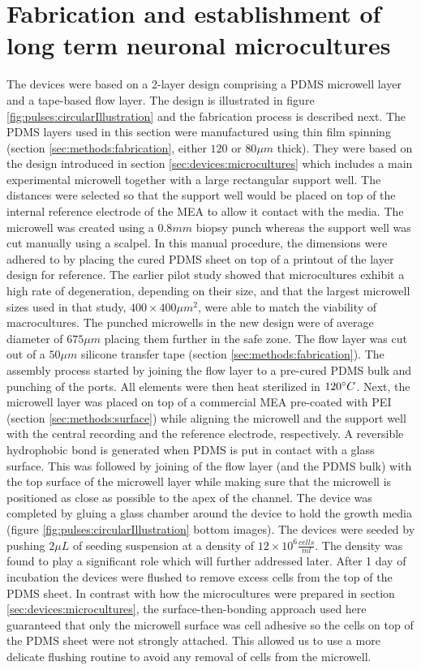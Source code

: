 \section{Fabrication and establishment of long term neuronal microcultures}
\label{sec:pulses:microcultures}
The devices were based on a 2-layer design comprising a PDMS microwell layer and a tape-based flow layer. The design is illustrated in figure \ref{fig:pulses:circularIllustration} and the fabrication process is described next. The PDMS layers used in this section were manufactured using thin film spinning (section \ref{sec:methods:fabrication}, either \(120\) or \(80 \mu m\) thick). They were based on the design introduced in section \ref{sec:devices:microcultures} which includes a main experimental microwell together with a large rectangular support well. The distances were selected so that the support well would be placed on top of the internal reference electrode of the MEA to allow it contact with the media. The microwell was created using a \(0.8 mm\) biopsy punch whereas the support well was cut manually using a scalpel. In this manual procedure, the dimensions were adhered to by placing the cured PDMS sheet on top of a printout of the layer design for reference. The earlier pilot study showed that microcultures exhibit a high rate of degeneration, depending on their size, and that the largest microwell sizes used in that study, \(400\times 400 \mu m^{2}\), were able to match the viability of macrocultures. The punched microwells in the new design were of average diameter of \(675 \mu m\) placing them further in the safe zone. The flow layer was cut out of a \(50 \mu m\) silicone transfer tape (section \ref{sec:methods:fabrication}). The assembly process started by joining the flow layer to a pre-cured PDMS bulk and punching of the ports. All elements were then heat sterilized in \(120\degree C\). Next, the microwell layer was placed on top of a commercial MEA pre-coated with PEI (section \ref{sec:methods:surface}) while aligning the microwell and the support well with the central recording and the reference electrode, respectively. A reversible hydrophobic bond is generated when PDMS is put in contact with a glass surface. This was followed by joining of the flow layer (and the PDMS bulk) with the top surface of the microwell layer while making sure that the microwell is positioned as close as possible to the apex of the channel. The device was completed by gluing a glass chamber around the device to hold the growth media (figure \ref{fig:pulses:circularIllustration} bottom images). The devices were seeded by pushing \(2 \mu L\) of seeding suspension at a density of \(12\times 10^{6} \frac{cells}{ml}\). The density was found to play a significant role which will further addressed later. After 1 day of incubation the devices were flushed to remove excess cells from the top of the PDMS sheet. In contrast with how the microcultures were prepared in section \ref{sec:devices:microcultures}, the surface-then-bonding approach used here guaranteed that only the microwell surface was cell adhesive so the cells on top of the PDMS sheet were not strongly attached. This allowed us to use a more delicate flushing routine to avoid any removal of cells from the microwell. 